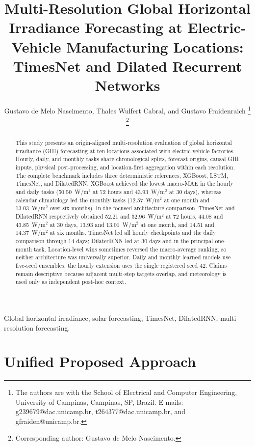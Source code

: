 \documentclass[10pt,journal]{IEEEtran}
\title{Multi-Resolution Global Horizontal Irradiance Forecasting at Electric-Vehicle Manufacturing Locations: TimesNet and Dilated Recurrent Networks}
\author{Gustavo de Melo Nascimento, Thales Wulfert Cabral, and Gustavo Fraidenraich%
\thanks{The authors are with the School of Electrical and Computer Engineering,
University of Campinas, Campinas, SP, Brazil. E-mails: g239679@dac.unicamp.br,
t264377@dac.unicamp.br, and gfraiden@unicamp.br.}%
\thanks{Corresponding author: Gustavo de Melo Nascimento.}}
\begin{document}
\maketitle

\begin{abstract}
This study presents an origin-aligned multi-resolution evaluation of global
horizontal irradiance (GHI) forecasting at ten locations associated with
electric-vehicle factories. Hourly, daily, and monthly tasks share
chronological splits, forecast origins, causal GHI inputs, physical
post-processing, and location-first aggregation within each resolution.
The complete benchmark includes three deterministic references, XGBoost,
LSTM, TimesNet, and DilatedRNN. XGBoost achieved the lowest macro-MAE in the
hourly and daily tasks (50.50~W/m$^2$ at 72 hours and 43.93~W/m$^2$ at
30 days), whereas calendar climatology led the monthly tasks (12.57~W/m$^2$
at one month and 13.03~W/m$^2$ over six months). In the focused architecture
comparison, TimesNet and DilatedRNN respectively obtained 52.21 and
52.96~W/m$^2$ at 72 hours, 44.08 and 43.85~W/m$^2$ at 30 days, 13.93
and 13.01~W/m$^2$ at one month, and 14.51 and 14.37~W/m$^2$ at six
months. TimesNet led all hourly checkpoints and the daily comparison through
14 days; DilatedRNN led at 30 days and in the principal one-month task.
Location-level wins sometimes reversed the macro-average ranking, so neither
architecture was universally superior. Daily and monthly learned models use
five-seed ensembles; the hourly extension uses the single registered seed 42.
Claims remain descriptive because adjacent multi-step targets overlap, and
meteorology is used only as independent post-hoc context.
\end{abstract}

\begin{IEEEkeywords}
Global horizontal irradiance, solar forecasting, TimesNet, DilatedRNN,
multi-resolution forecasting.
\end{IEEEkeywords}





\section{Unified Proposed Approach}
\label{sec:proposed_approach}




\end{document}
